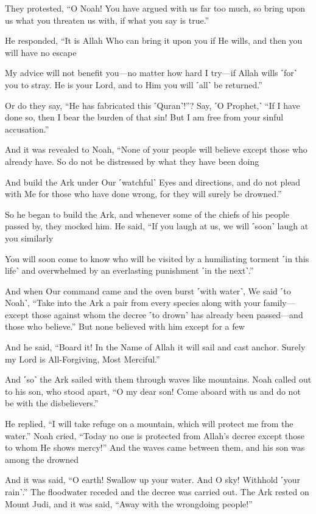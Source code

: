 They protested, “O Noah! You have argued with us far too much, so bring upon us what you threaten us with, if what you say is true.”

He responded, “It is Allah Who can bring it upon you if He wills, and then you will have no escape

My advice will not benefit you—no matter how hard I try—if Allah wills ˹for˺ you to stray. He is your Lord, and to Him you will ˹all˺ be returned.”

Or do they say, “He has fabricated this ˹Quran˺!”? Say, ˹O Prophet,˺ “If I have done so, then I bear the burden of that sin! But I am free from your sinful accusation.”

And it was revealed to Noah, “None of your people will believe except those who already have. So do not be distressed by what they have been doing

And build the Ark under Our ˹watchful˺ Eyes and directions, and do not plead with Me for those who have done wrong, for they will surely be drowned.”

So he began to build the Ark, and whenever some of the chiefs of his people passed by, they mocked him. He said, “If you laugh at us, we will ˹soon˺ laugh at you similarly

You will soon come to know who will be visited by a humiliating torment ˹in this life˺ and overwhelmed by an everlasting punishment ˹in the next˺.”

And when Our command came and the oven burst ˹with water˺, We said ˹to Noah˺, “Take into the Ark a pair from every species along with your family—except those against whom the decree ˹to drown˺ has already been passed—and those who believe.” But none believed with him except for a few

And he said, “Board it! In the Name of Allah it will sail and cast anchor. Surely my Lord is All-Forgiving, Most Merciful.”

And ˹so˺ the Ark sailed with them through waves like mountains. Noah called out to his son, who stood apart, “O my dear son! Come aboard with us and do not be with the disbelievers.”

He replied, “I will take refuge on a mountain, which will protect me from the water.” Noah cried, “Today no one is protected from Allah’s decree except those to whom He shows mercy!” And the waves came between them, and his son was among the drowned

And it was said, “O earth! Swallow up your water. And O sky! Withhold ˹your rain˺.” The floodwater receded and the decree was carried out. The Ark rested on Mount Judi, and it was said, “Away with the wrongdoing people!”

